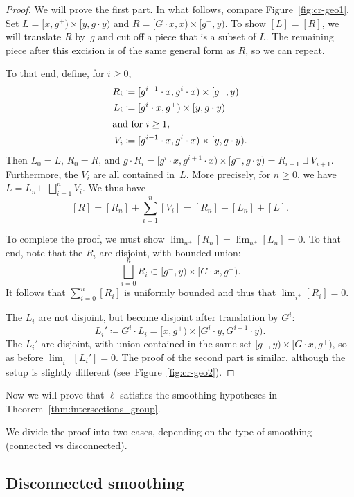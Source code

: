 \begin{proof}
  We will prove the first part.
  In what follows, compare Figure~\ref{fig:cr-geo1}.
  Set $L = [x,g^+)\times[y,g \cdot y)$ and
  $R = [G \cdot x,x)\times[g^-,y)$. To show $[L] = [R]$, we will
  translate $R$ by~$g$ and cut off a piece that is a subset of $L$.
  The remaining piece after this excision is of the same general form
  as $R$, so we can repeat.

  To that end, define, for $i \ge 0$,
  \begin{align*}
    R_i &\coloneqq [g^{i-1}\cdot x, g^i \cdot x) \times [g^-, y)\\
    L_i &\coloneqq [g^i \cdot x,g^+) \times [y, g \cdot y)\\
    \intertext{and for $i \ge 1$,}
    V_i &\coloneqq [g^{i-1} \cdot x, g^i \cdot x) \times [y, g \cdot y).
  \end{align*}
  Then $L_0 = L$, $R_0 = R$, and
  $g \cdot R_i = [g^i \cdot x, g^{i+1} \cdot x) \times [g^-, g \cdot
  y) = R_{i+1} \sqcup V_{i+1}$.
  Furthermore, the $V_i$ are all contained in~$L$. More precisely, for
  $n\ge 0$, we have $L = L_n \sqcup \bigsqcup_{i=1}^n V_i$.
  We thus have
  \[
    [R] = [R_n] + \sum_{i=1}^n [V_i] = [R_n] - [L_n] + [L].
  \]

  To complete the proof, we must show
  $\lim_{n^+} [R_n] = \lim_{n^+}[L_n] = 0$. To that end, note that the
  $R_i$ are disjoint, with bounded union:
  \[
    \bigsqcup_{i=0}^n R_i \subset [g^-,y) \times [G \cdot x, g^+).
  \]
  It follows that $\sum_{i=0}^n [R_i]$ is uniformly bounded and thus
  that $\lim_{i^+} [R_i] = 0$.

  The $L_i$ are not disjoint, but become disjoint after translation by
  $G^i$:
  \[
    L_i' \coloneqq G^i \cdot L_i = [x, g^+) \times [G^i \cdot y, G^{i-1} \cdot y).
  \]
  The $L_i'$ are disjoint, with union contained in the same set
  $[g^-,y) \times [G \cdot x, g^+)$, so as before $\lim_{i^+} [L_i'] = 0$.
  The proof of the second part is similar, although the setup is slightly different (see~Figure~\ref{fig:cr-geo2}).
\end{proof}

Now we will prove that $\ell$ satisfies the smoothing hypotheses in Theorem~\ref{thm:intersections_group}.

We divide the proof into two cases, depending on the type of smoothing (connected vs disconnected).



\subsection{Disconnected smoothing}

